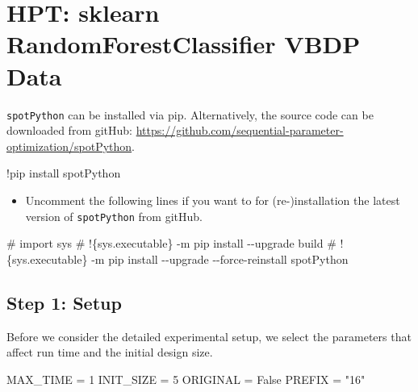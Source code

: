 \documentclass[
  letterpaper,
  DIV=11,
  numbers=noendperiod]{scrreprt}
\newenvironment{Shaded}{\begin{snugshade}}{\end{snugshade}}
\newcommand{\CommentTok}[1]{\textcolor[rgb]{0.37,0.37,0.37}{#1}}
\newcommand{\DecValTok}[1]{\textcolor[rgb]{0.68,0.00,0.00}{#1}}
\newcommand{\NormalTok}[1]{\textcolor[rgb]{0.00,0.23,0.31}{#1}}
\newcommand{\OperatorTok}[1]{\textcolor[rgb]{0.37,0.37,0.37}{#1}}
\newcommand{\StringTok}[1]{\textcolor[rgb]{0.13,0.47,0.30}{#1}}
\newcommand{\VariableTok}[1]{\textcolor[rgb]{0.07,0.07,0.07}{#1}}
\providecommand{\tightlist}{%
  \setlength{\itemsep}{0pt}\setlength{\parskip}{0pt}}\usepackage{longtable,booktabs,array}
\begin{document}
\hypertarget{sec-hpt-random-forest-classifier}{%
\chapter{HPT: sklearn RandomForestClassifier VBDP
Data}\label{sec-hpt-random-forest-classifier}}

\texttt{spotPython} can be installed via pip. Alternatively, the source
code can be downloaded from gitHub:
\url{https://github.com/sequential-parameter-optimization/spotPython}.

\begin{Shaded}
\begin{Highlighting}[]
\NormalTok{!pip install spotPython}
\end{Highlighting}
\end{Shaded}

\begin{itemize}
\tightlist
\item
  Uncomment the following lines if you want to for (re-)installation the
  latest version of \texttt{spotPython} from gitHub.
\end{itemize}

\begin{Shaded}
\begin{Highlighting}[]
\CommentTok{\# import sys}
\CommentTok{\# !\{sys.executable\} {-}m pip install {-}{-}upgrade build}
\CommentTok{\# !\{sys.executable\} {-}m pip install {-}{-}upgrade {-}{-}force{-}reinstall spotPython}
\end{Highlighting}
\end{Shaded}

\hypertarget{sec-setup-16}{%
\section{Step 1: Setup}\label{sec-setup-16}}

Before we consider the detailed experimental setup, we select the
parameters that affect run time and the initial design size.

\begin{Shaded}
\begin{Highlighting}[]
\NormalTok{MAX\_TIME }\OperatorTok{=} \DecValTok{1}
\NormalTok{INIT\_SIZE }\OperatorTok{=} \DecValTok{5}
\NormalTok{ORIGINAL }\OperatorTok{=} \VariableTok{False}
\NormalTok{PREFIX }\OperatorTok{=} \StringTok{"16"}
\end{Highlighting}
\end{Shaded}
\end{document}
